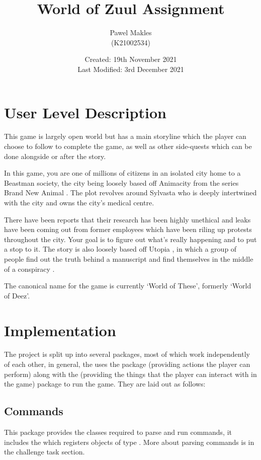 \documentclass{article}
\title{World of Zuul Assignment}
\author{Pawel Makles \\ \small (K21002534)}
\date{\small Created: 19th November 2021 \\ Last Modified: 3rd December 2021}
\begin{document}
\maketitle

    \begin{multicols}{2}
        \section{User Level Description}
        This game is largely open world but has a main storyline which the player can choose to follow to complete the game, as well as other side-quests which can be done alongside or after the story.

        In this game, you are one of millions of citizens in an isolated city home to a Beastman \cite{beastman} society, the city being loosely based off Animacity \cite{animacity} from the series Brand New Animal \cite{bna}. The plot revolves around Sylvasta who is deeply intertwined with the city and owns the city's medical centre.

        There have been reports that their research has been highly unethical and leaks have been coming out from former employees which have been riling up protests throughout the city. Your goal is to figure out what's really happening and to put a stop to it. The story is also loosely based off Utopia \cite{utopia}, in which a group of people find out the truth behind a manuscript and find themselves in the middle of a conspiracy \cite{pyrocynical}.

        The canonical name for the game is currently `World of These', formerly `World of Deez'.
        
        \section{Implementation}
        The project is split up into several packages, most of which work independently of each other, in general, the  uses the  package (providing actions the player can perform) along with the  (providing the things that the player can interact with in the game) package to run the game. They are laid out as follows:
        
            \subsection{Commands}
            This package provides the classes required to parse and run commands, it includes the  which registers objects of type . More about parsing commands is in the challenge task section.


\end{multicols}
\end{document}
